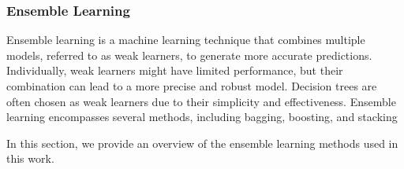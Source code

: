 \subsubsection{Ensemble Learning}
Ensemble learning is a machine learning technique that combines multiple models, referred to as weak learners, to generate more accurate predictions.
Individually, weak learners might have limited performance, but their combination can lead to a more precise and robust model.
Decision trees are often chosen as weak learners due to their simplicity and effectiveness.
Ensemble learning encompasses several methods, including bagging, boosting, and stacking\cite{James2023AnIS, pavlyshenko2018stacking}

In this section, we provide an overview of the ensemble learning methods used in this work.